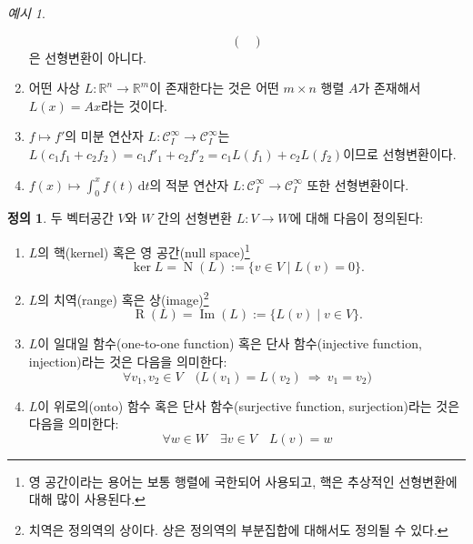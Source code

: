 \documentclass[unfonts,oneside,a4paper]{oblivoir}
\theoremstyle{definition}
\newtheorem{definition}{정의}[section]
\theoremstyle{theorem}
\theoremstyle{theorem}
\theoremstyle{remark}
\theoremstyle{remark}
\theoremstyle{remark}
\newtheorem*{example}{예시}
\theoremstyle{remark}
\renewcommand{\vec}[1]{\bm{\mathit{#1}}}
\newcommand{\vecz}{\bm{\mathrm{0}}}
\newcommand{\dd}{\mathrm{d}}
\DeclareMathOperator{\Null}{N}
\DeclareMathOperator{\Image}{Im}
\DeclareMathOperator{\Range}{R}
\begin{document}
\begin{example}
\begin{enumerate}
\begin{equation*}
\begin{pmatrix}
                \end{pmatrix}
            \end{equation*}
            은 선형변환이 아니다.
        \item 어떤 사상 $L: \mathbb R^n \rightarrow \mathbb R^m$이 존재한다는 것은 어떤 $m \times n$ 행렬 $A$가 존재해서 $L(\vec x) = A \vec x$라는 것이다.
        \item $f \mapsto f'$의 미분 연산자 $L: \mathcal C^\infty_I \rightarrow \mathcal C^\infty_I$는 $L(c_1 f_1 + c_2 f_2) = c_1 f'_1 + c_2 f'_2 = c_1 L(f_1) + c_2 L(f_2)$이므로 선형변환이다.
        \item $f(x) \mapsto \int_0^x f(t)\, \dd t$의 적분 연산자 $L: \mathcal C^\infty_I \rightarrow \mathcal C^\infty_I$ 또한 선형변환이다.
    \end{enumerate}
\end{example}

\begin{definition}
    두 벡터공간 $V$와 $W$ 간의 선형변환 $L: V \rightarrow W$에 대해 다음이 정의된다:
    \begin{enumerate}
        \item $L$의 핵(kernel) 혹은 영 공간(null space)\footnote{영 공간이라는 용어는 보통 행렬에 국한되어 사용되고, 핵은 추상적인 선형변환에 대해 많이 사용된다.}
            \begin{equation*}
                \ker L = \Null (L) := \{\vec v \in V \mid L(\vec v) = \vecz\}.
            \end{equation*} 
        \item $L$의 치역(range) 혹은 상(image)\footnote{치역은 정의역의 상이다. 상은 정의역의 부분집합에 대해서도 정의될 수 있다.}
            \begin{equation*}
                \Range (L) = \Image (L) := \{L(\vec v) \mid \vec v \in V\}.
            \end{equation*}
        \item $L$이 일대일 함수(one-to-one function) 혹은 단사 함수(injective function, injection)라는 것은 다음을 의미한다:
            \begin{equation*}
                \forall \vec v_1, \vec v_2 \in V \quad \bigl(L(\vec v_1) = L(\vec v_2)\ \Rightarrow\ \vec v_1 = \vec v_2\bigr)
            \end{equation*}
        \item $L$이 위로의(onto) 함수 혹은 단사 함수(surjective function, surjection)라는 것은 다음을 의미한다:
            \begin{equation*}
                \forall \vec w \in W \quad \exists \vec v \in V \quad L(\vec v) = \vec w
            \end{equation*}
    \end{enumerate}
\end{definition}
\end{document}
